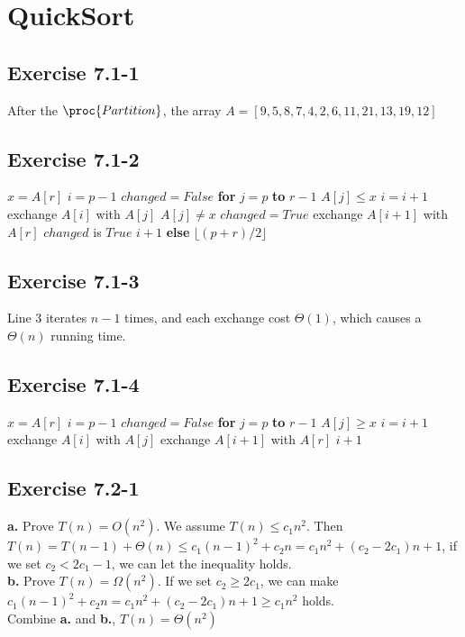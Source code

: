 \documentclass[12pt]{article}
\theoremstyle{definition}
\theoremstyle{remark}
\begin{document}
\section{QuickSort}
\subsection*{Exercise 7.1-1}
After the $\proc{Partition}$, the array $A=[9,5,8,7,4,2,6,11,21,13,19,12]$
\subsection*{Exercise 7.1-2}
\begin{codebox}
\li $x=A[r]$
\li $i=p-1$
\li $changed=False$
\li \textbf{for} $j=p$ \textbf{to} $r-1$
\li \quad \If $A[j]\le x$
\li \qquad $i=i+1$
\li \qquad exchange $A[i]$ with $A[j]$
\li \qquad \If $A[j]\ne x$
\li \quad \qquad $changed=True$
\li exchange $A[i+1]$ with $A[r]$
\li \If $changed$ is $True$
\li \quad \Return $i+1$
\li \textbf{else}
\li \quad \Return $\lfloor(p+r)/2\rfloor$
\end{codebox}
\subsection*{Exercise 7.1-3}
Line 3 iterates $n-1$ times, and each exchange cost $\Theta(1)$, which causes a $\Theta(n)$ running time.
\subsection*{Exercise 7.1-4}
\begin{codebox}
\li $x=A[r]$
\li $i=p-1$
\li $changed=False$
\li \textbf{for} $j=p$ \textbf{to} $r-1$
\li \quad \If $A[j]\ge x$
\li \qquad $i=i+1$
\li \qquad exchange $A[i]$ with $A[j]$
\li exchange $A[i+1]$ with $A[r]$
\li \Return $i+1$
\end{codebox}
\subsection*{Exercise 7.2-1}
\textbf{a.} Prove $T(n)=O(n^2)$. We assume $T(n)\le c_1n^2$. Then $T(n)=T(n-1)+\Theta(n)\le c_1(n-1)^2+c_2n=c_1n^2+(c_2-2c_1)n+1$, if we set $c_2<2c_1-1$, we can let the inequality holds.\\
\textbf{b.} Prove $T(n)=\Omega(n^2)$. If we set $c_2\ge2c_1$, we can make $c_1(n-1)^2+c_2n=c_1n^2+(c_2-2c_1)n+1\ge c_1n^2$ holds.\\
Combine \textbf{a.} and \textbf{b.}, $T(n)=\Theta(n^2)$
\end{document}
